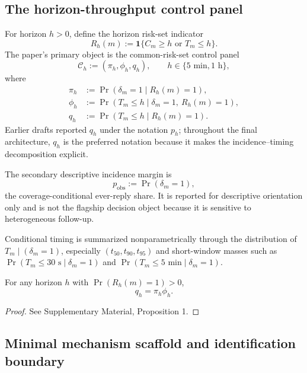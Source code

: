 \subsection{The horizon-throughput control panel}
\label{sec:model:estimands}

For horizon \(h>0\), define the horizon risk-set indicator
\[
R_h(m):=\mathbf{1}\{C_m\ge h \text{ or } T_m\le h\}.
\]
The paper's primary object is the common-risk-set control panel
\[
\mathcal{C}_h := (\pi_h,\phi_h,q_h), \qquad h\in\{5\text{ min},1\text{ h}\},
\]
where
\begin{align}
\pi_h &:= \Pr(\delta_m=1 \mid R_h(m)=1), \\
\phi_h &:= \Pr(T_m\le h \mid \delta_m=1,\ R_h(m)=1), \\
q_h &:= \Pr(T_m\le h \mid R_h(m)=1).
\end{align}
Earlier drafts reported \(q_h\) under the notation \(p_h\); throughout the
final architecture, \(q_h\) is the preferred notation because it makes the
incidence--timing decomposition explicit.

The secondary descriptive incidence margin is
\[
p_{\mathrm{obs}}:=\Pr(\delta_m=1),
\]
the coverage-conditional ever-reply share. It is reported for descriptive
orientation only and is not the flagship decision object because it is sensitive
to heterogeneous follow-up.

Conditional timing is summarized nonparametrically through the distribution of
\(T_m\mid (\delta_m=1)\), especially
\((t_{50},t_{90},t_{95})\) and short-window masses such as
\(\Pr(T_m\le 30\text{ s}\mid \delta_m=1)\) and
\(\Pr(T_m\le 5\text{ min}\mid \delta_m=1)\).

\begin{proposition}
\label{prop:risk-set-factorization}
For any horizon \(h\) with \(\Pr(R_h(m)=1)>0\),
\begin{equation}
\label{eq:horizon-throughput-factorization}
q_h = \pi_h \phi_h.
\end{equation}
\end{proposition}

\begin{proof}
See Supplementary Material, Proposition 1.
\end{proof}

\subsection{Minimal mechanism scaffold and identification boundary}
\label{sec:model:mechanism}

